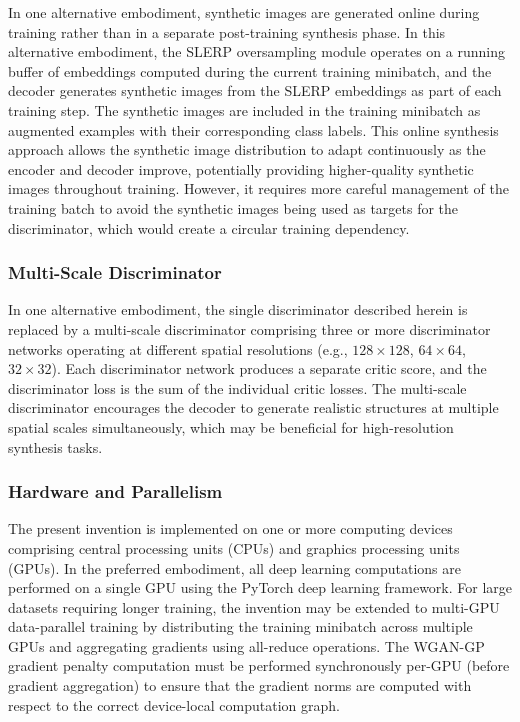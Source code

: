 \documentclass[12pt,letterpaper]{article}
\begin{document}
In one alternative embodiment, synthetic images are generated online during
training rather than in a separate post-training synthesis phase. In this
alternative embodiment, the SLERP oversampling module operates on a running
buffer of embeddings computed during the current training minibatch, and the
decoder generates synthetic images from the SLERP embeddings as part of each
training step. The synthetic images are included in the training minibatch as
augmented examples with their corresponding class labels. This online synthesis
approach allows the synthetic image distribution to adapt continuously as the
encoder and decoder improve, potentially providing higher-quality synthetic
images throughout training. However, it requires more careful management of the
training batch to avoid the synthetic images being used as targets for the
discriminator, which would create a circular training dependency.

\subsubsection{Multi-Scale Discriminator}

In one alternative embodiment, the single discriminator described herein is
replaced by a multi-scale discriminator comprising three or more
discriminator networks operating at different spatial resolutions (e.g.,
$128 \times 128$, $64 \times 64$, $32 \times 32$). Each discriminator network
produces a separate critic score, and the discriminator loss is the sum of the
individual critic losses. The multi-scale discriminator encourages the decoder
to generate realistic structures at multiple spatial scales simultaneously,
which may be beneficial for high-resolution synthesis tasks.

\subsubsection{Hardware and Parallelism}

The present invention is implemented on one or more computing devices comprising
central processing units (CPUs) and graphics processing units (GPUs). In the
preferred embodiment, all deep learning computations are performed on a single
GPU using the PyTorch deep learning framework. For large datasets requiring
longer training, the invention may be extended to multi-GPU data-parallel
training by distributing the training minibatch across multiple GPUs and
aggregating gradients using all-reduce operations. The WGAN-GP gradient penalty
computation must be performed synchronously per-GPU (before gradient
aggregation) to ensure that the gradient norms are computed with respect to the
correct device-local computation graph.
\end{document}
